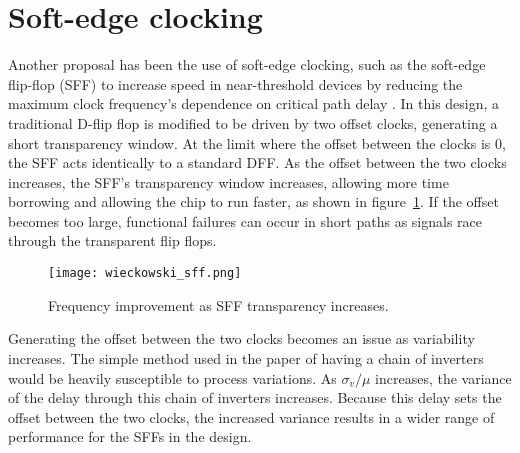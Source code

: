  \section{Soft-edge clocking}
Another proposal has been the use of soft-edge clocking, such as the soft-edge flip-flop (SFF) to increase speed in near-threshold devices by reducing the maximum clock frequency's dependence on critical path delay \cite{Wieckowski:2008bo}.
 In this design, a traditional D-flip flop is modified to be driven by two offset clocks, generating a short transparency window.
 At the limit where the offset between the clocks is 0, the SFF acts identically to a standard DFF.
 As the offset between the two clocks increases, the SFF's transparency window increases, allowing more time borrowing and allowing the chip to run faster, as shown in figure~\ref{fig:sff}.
 If the offset becomes too large, functional failures can occur in short paths as signals race through the transparent flip flops. 
\begin{figure}[thpb]
    \centering
    \texttt{[image: wieckowski\_sff.png]}
    \caption{Frequency improvement as SFF transparency increases.~\cite{Wieckowski:2008bo}}
    \label{fig:sff}
\end{figure}

Generating the offset between the two clocks becomes an issue as variability increases.
 The simple method used in the paper of having a chain of inverters would be heavily susceptible to process variations.
As $\sigma_v/\mu$ increases, the variance of the delay through this chain of inverters increases.
Because this delay sets the offset between the two clocks, the increased variance results in a wider range of performance for the SFFs in the design.

